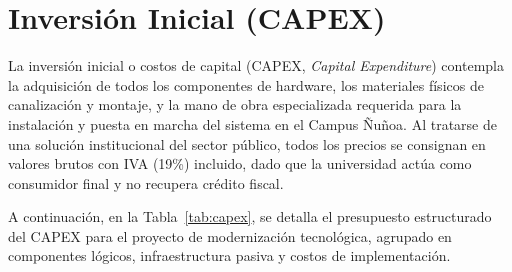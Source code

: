 \section{Inversión Inicial (CAPEX)}
\label{sec:capex}

La inversión inicial o costos de capital (CAPEX, \textit{Capital Expenditure}) contempla la adquisición de todos los componentes de hardware, los materiales físicos de canalización y montaje, y la mano de obra especializada requerida para la instalación y puesta en marcha del sistema en el Campus Ñuñoa. Al tratarse de una solución institucional del sector público, todos los precios se consignan en valores brutos con IVA (19\%) incluido, dado que la universidad actúa como consumidor final y no recupera crédito fiscal.

A continuación, en la Tabla~\ref{tab:capex}, se detalla el presupuesto estructurado del CAPEX para el proyecto de modernización tecnológica, agrupado en componentes lógicos, infraestructura pasiva y costos de implementación.

